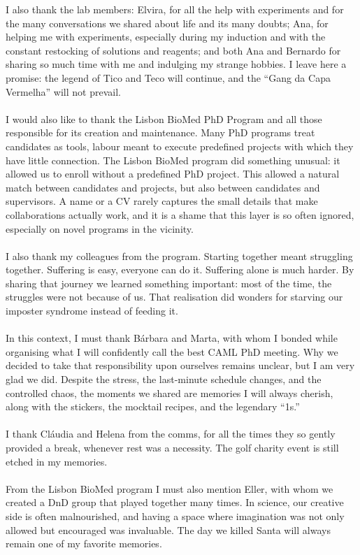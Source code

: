 I also thank the lab members: Elvira, for all the help with experiments and for the many conversations we shared about life and its many doubts; Ana, for helping me with experiments, especially during my induction and with the constant restocking of solutions and reagents; and both Ana and Bernardo for sharing so much time with me and indulging my strange hobbies. I leave here a promise: the legend of Tico and Teco will continue, and the “Gang da Capa Vermelha” will not prevail.
\\
\\
I would also like to thank the Lisbon BioMed PhD Program and all those responsible for its creation and maintenance. Many PhD programs treat candidates as tools, labour meant to execute predefined projects with which they have little connection. The Lisbon BioMed program did something unusual: it allowed us to enroll without a predefined PhD project. This allowed a natural match between candidates and projects, but also between candidates and supervisors. A name or a CV rarely captures the small details that make collaborations actually work, and it is a shame that this layer is so often ignored, especially on novel programs in the vicinity.
\\
\\
I also thank my colleagues from the program. Starting together meant struggling together. Suffering is easy, everyone can do it. Suffering alone is much harder. By sharing that journey we learned something important: most of the time, the struggles were not because of us. That realisation did wonders for starving our imposter syndrome instead of feeding it.
\\
\\
In this context, I must thank Bárbara and Marta, with whom I bonded while organising what I will confidently call the best CAML PhD meeting. Why we decided to take that responsibility upon ourselves remains unclear, but I am very glad we did. Despite the stress, the last-minute schedule changes, and the controlled chaos, the moments we shared are memories I will always cherish, along with the stickers, the mocktail recipes, and the legendary “1s.”
\\
\\
I thank Cláudia and Helena from the comms, for all the times they so gently provided a break, whenever rest was a necessity. The golf charity event is still etched in my memories.
\\
\\
From the Lisbon BioMed program I must also mention Eller, with whom we created a DnD group that played together many times. In science, our creative side is often malnourished, and having a space where imagination was not only allowed but encouraged was invaluable. The day we killed Santa will always remain one of my favorite memories.
